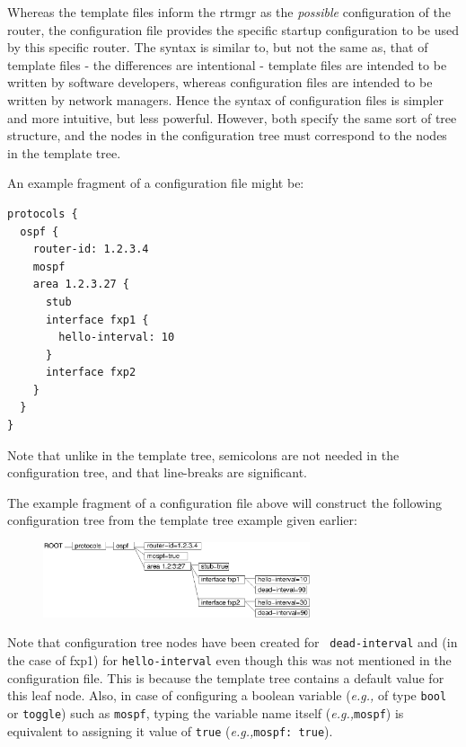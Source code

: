 \documentclass[11pt]{article}
\newcommand{\eg}{\emph{e.g.,}\xspace}
\begin{document}
Whereas the template files inform the rtrmgr as the {\it possible}
configuration of the router, the configuration file provides the
specific startup configuration to be used by this specific router.
The syntax is similar to, but not the same as, that of template files -
the differences are intentional - template files are intended to be
written by software developers, whereas configuration files are
intended to be written by network managers.  Hence the syntax of
configuration files is simpler and more intuitive, but less powerful.
However, both specify the same sort of tree structure, and the nodes
in the configuration tree must correspond to the nodes in the template
tree.

An example fragment of a configuration file might be:

\begin{verbatim}
protocols {
  ospf {
    router-id: 1.2.3.4
    mospf
    area 1.2.3.27 {
      stub
      interface fxp1 {
        hello-interval: 10
      }
      interface fxp2
    }
  }
}
\end{verbatim}

Note that unlike in the template tree, semicolons are not needed in the
configuration tree, and that line-breaks are significant.

The example fragment of a configuration file above will construct the
following configuration tree from the template tree example given
earlier:

\begin{figure}[htb]
\centerline{\includegraphics[width=0.7\textwidth]{figs/config}}
\vspace{.05in}
\end{figure}

Note that configuration tree nodes have been created for {\tt
dead-interval} and (in the case of fxp1) for {\tt hello-interval} even
though this was not mentioned in the configuration file.  This is
because the template tree contains a default value for this leaf node.
Also, in case of configuring a boolean variable (\eg of type {\tt bool} or
{\tt toggle}) such as {\tt mospf}, typing the variable name itself
(\eg \verb=mospf=) is equivalent to assigning it value of {\tt true}
(\eg \verb=mospf: true=).
\end{document}
